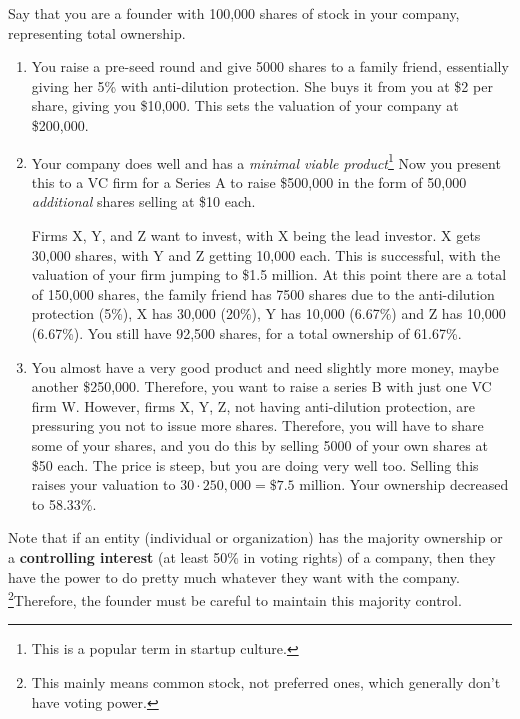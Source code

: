 \documentclass{article}
\begin{document}
    \begin{example}
      \label{ex:additional-investment}
      Say that you are a founder with 100,000 shares of stock in your company, representing total ownership. 
      \begin{enumerate}
        \item You raise a pre-seed round and give 5000 shares to a family friend, essentially giving her 5\% with anti-dilution protection. She buys it from you at \$2 per share, giving you \$10,000. This sets the valuation of your company at \$200,000. 

        \item Your company does well and has a \textit{minimal viable product}\footnote{This is a popular term in startup culture. } Now you present this to a VC firm for a Series A to raise \$500,000 in the form of 50,000 \textit{additional} shares selling at \$10 each. 

        Firms X, Y, and Z want to invest, with X being the lead investor. X gets 30,000 shares, with Y and Z getting 10,000 each. This is successful, with the valuation of your firm jumping to \$1.5 million. At this point there are a total of 150,000 shares, the family friend has 7500 shares due to the anti-dilution protection (5\%), X has 30,000 (20\%), Y has 10,000 (6.67\%) and Z has 10,000 (6.67\%). You still have 92,500 shares, for a total ownership of 61.67\%. 

        \item You almost have a very good product and need slightly more money, maybe another \$250,000. Therefore, you want to raise a series B with just one VC firm W. However, firms X, Y, Z, not having anti-dilution protection, are pressuring you not to issue more shares. Therefore, you will have to share some of your shares, and you do this by selling 5000 of your own shares at \$50 each. The price is steep, but you are doing very well too. Selling this raises your valuation to $30 \cdot 250,000 = \$7.5$ million. Your ownership decreased to 58.33\%. 
      \end{enumerate}
    \end{example}

    \begin{definition}
      \label{def:controlling-interest}
      Note that if an entity (individual or organization) has the majority ownership or a \textbf{controlling interest} (at least 50\% in voting rights) of a company, then they have the power to do pretty much whatever they want with the company.
      \footnote{This mainly means common stock, not preferred ones, which generally don't have voting power. }Therefore, the founder must be careful to maintain this majority control. 
    \end{definition}
\end{document}
